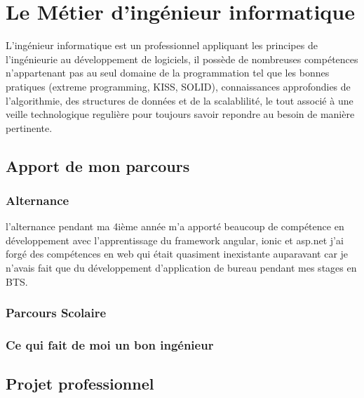 \chapter{Le Métier d'ingénieur informatique}
L'ingénieur informatique est un professionnel appliquant les principes de l'ingénieurie au développement de logiciels,
il possède de nombreuses compétences n'appartenant pas au seul domaine de la programmation tel que les bonnes pratiques 
(extreme programming, KISS, SOLID), connaissances approfondies de l'algorithmie, des structures de données 
et de la scalablilité, le tout associé à une veille technologique regulière pour toujours savoir
repondre au besoin de manière pertinente.

\section{Apport de mon parcours}
\subsection{Alternance}
l'alternance pendant ma 4ième année m'a apporté beaucoup de compétence en développement avec l'apprentissage 
du framework angular, ionic et asp.net 
j'ai forgé des compétences en web qui était quasiment inexistante auparavant car je n'avais fait que 
du développement d'application de bureau pendant mes stages en BTS. 


\subsection{Parcours Scolaire}


\subsection{Ce qui fait de moi un bon ingénieur}

\section{Projet professionnel}